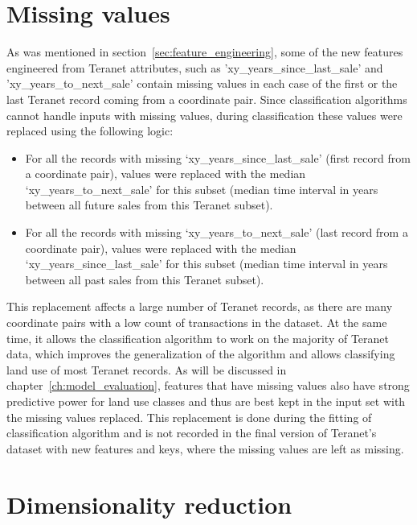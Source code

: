 \section{Missing values} \label{sec:missing_values}

As was mentioned in section~\ref{sec:feature_engineering}, some of the new features engineered from Teranet attributes, such as 'xy\_years\_since\_last\_sale' and 'xy\_years\_to\_next\_sale' contain missing values in each case of the first or the last Teranet record coming from a coordinate pair.
Since classification algorithms cannot handle inputs with missing values, during classification these values were replaced using the following logic:

\begin{itemize}
    \item For all the records with missing `xy\_years\_since\_last\_sale' (first record from a coordinate pair), values were replaced with the median `xy\_years\_to\_next\_sale' for this subset (median time interval in years between all future sales from this Teranet subset).
    \item For all the records with missing `xy\_years\_to\_next\_sale' (last record from a coordinate pair), values were replaced with the median `xy\_years\_since\_last\_sale' for this subset (median time interval in years between all past sales from this Teranet subset).
\end{itemize}

This replacement affects a large number of Teranet records, as there are many coordinate pairs with a low count of transactions in the dataset.
At the same time, it allows the classification algorithm to work on the majority of Teranet data, which improves the generalization of the algorithm and allows classifying land use of most Teranet records.
As will be discussed in chapter~\ref{ch:model_evaluation}, features that have missing values also have strong predictive power for land use classes and thus are best kept in the input set with the missing values replaced.
This replacement is done during the fitting of classification algorithm and is not recorded in the final version of Teranet's dataset with new features and keys, where the missing values are left as missing.

\section{Dimensionality reduction} \label{sec:dimensionality_reduction}

